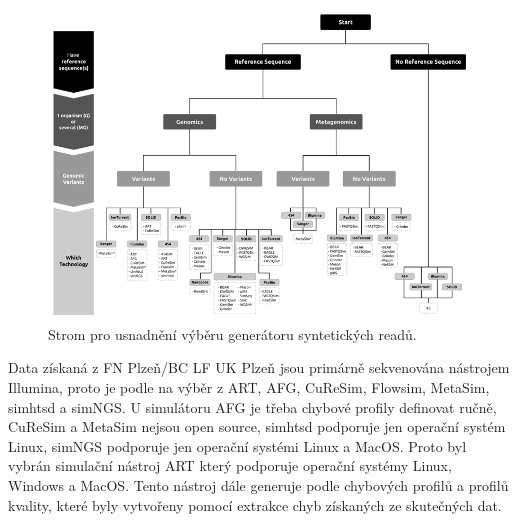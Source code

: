 \documentclass[czech,DP]{thesiskiv}
\numberwithin{equation}{section}
\begin{document}
\begin{figure}[H]		
		\centering
		\includegraphics[width=1\textwidth]{./img/read_simulators.jpg}
		\caption{Strom pro usnadnění výběru generátoru syntetických readů. \cite{simulation_read}}
		\label{fig:read_simulators}
\end{figure}

\noindent
Data získaná z FN Plzeň/BC LF UK Plzeň jsou primárně sekvenována nástrojem Illumina, proto je podle \cite{simulation_read} na výběr z ART, AFG, CuReSim, Flowsim, MetaSim, simhtsd a simNGS. U simulátoru AFG je třeba chybové profily definovat ručně, CuReSim a MetaSim nejsou open source, simhtsd podporuje jen operační systém Linux, simNGS podporuje jen operační systémi Linux a MacOS. Proto byl vybrán simulační nástroj ART který podporuje operační systémy Linux, Windows a MacOS. Tento nástroj dále generuje podle chybových profilů a profilů kvality, které byly vytvořeny pomocí extrakce chyb získaných ze skutečných dat. 
\end{document}
